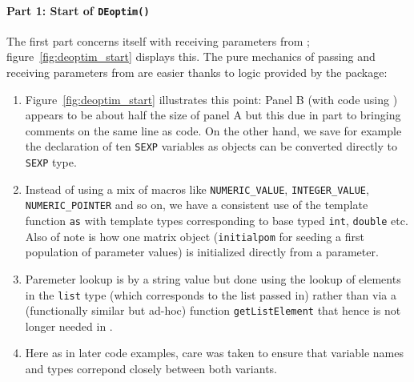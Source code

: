\documentclass[nojss,shortnames,article]{jss}
\begin{document}
\paragraph{Part 1: Start of \texttt{DEoptim()}} The first part concerns
itself with receiving parameters from ;
figure~\ref{fig:deoptim_start} displays this. The pure mechanics of passing and
receiving parameters from  are easier thanks to logic provided by
the  package:
\begin{enumerate}
\item Figure~\ref{fig:deoptim_start} illustrates this point: Panel B (with code
  using ) appears to be about half the size of panel A but this
  due in part to bringing comments on the same line as code. On the other
  hand, we save for example the declaration of ten \texttt{SEXP} variables as
   objects can be converted directly to \texttt{SEXP} type.
\item Instead of using a mix of macros like \verb|NUMERIC_VALUE|,
  \verb|INTEGER_VALUE|, \texttt{NUMERIC\_POINTER} and so on, we have a
  consistent use of the  template function \verb|as| with template
  types corresponding to base typed \verb|int|, \verb|double| etc. Also of
  note is how one matrix object (\texttt{initialpom} for seeding a first
  population of parameter values) is initialized directly from a parameter.
\item Paremeter lookup is by a string value but done using the  lookup
  of elements in the \verb|list| type (which corresponds to the 
  list passed in) rather than via a (functionally similar but ad-hoc) function
  \verb|getListElement| that hence is not longer needed in .
\item Here as in later code examples, care was taken to ensure that variable
  names and types correpond closely between both variants.
\end{enumerate}
\end{document}
